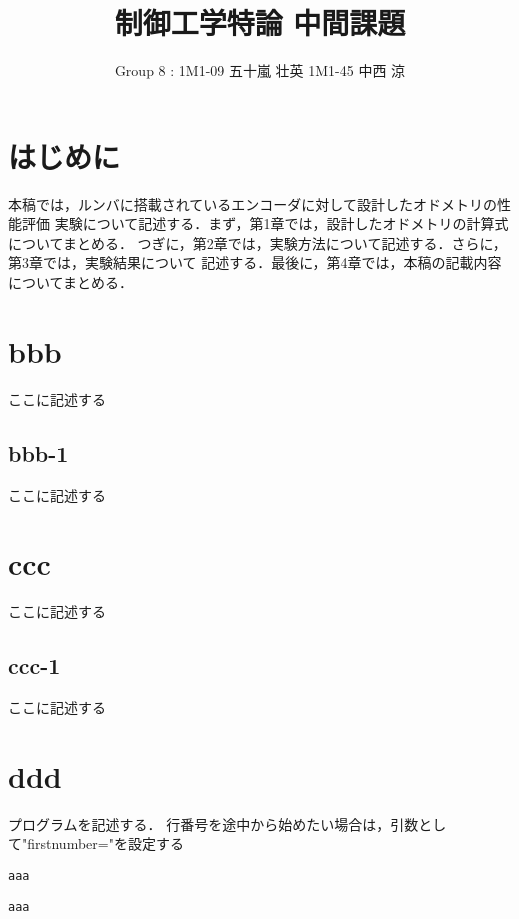 \documentclass[a4paper]{jarticle}
\title{制御工学特論 中間課題}
\author{Group 8 : 1M1-09 五十嵐 壮英 1M1-45 中西 涼}
\date{\todayAD}
\begin{document}
\maketitle
\section{はじめに}
\label{はじめに}
本稿では，ルンバに搭載されているエンコーダに対して設計したオドメトリの性能評価
実験について記述する．まず，第1章では，設計したオドメトリの計算式についてまとめる．
つぎに，第2章では，実験方法について記述する．さらに，第3章では，実験結果について
記述する．最後に，第4章では，本稿の記載内容についてまとめる．
\vspace{2.5mm}
%
\vspace{7.5mm}
\section{bbb}
\label{bbb}
ここに記述する
\vspace{2.5mm}
%
\subsection{bbb-1}
\label{bbb-1}
ここに記述する
\vspace{7.5mm}
\section{ccc}
\label{ccc}
ここに記述する
\vspace{2.5mm}
%
\subsection{ccc-1}
\label{ccc-1}
ここに記述する
\vspace{7.5mm}
\section{ddd}
\label{ddd}
プログラムを記述する．
行番号を途中から始めたい場合は，引数として"firstnumber="を設定する
%
\begin{lstlisting}[caption={firstnumber=101の場合}, firstnumber=101]
aaa
\end{lstlisting}
%
\begin{lstlisting}[caption={firstnumber=50の場合}, firstnumber=50]
aaa
\end{lstlisting}
% 
\end{document}

